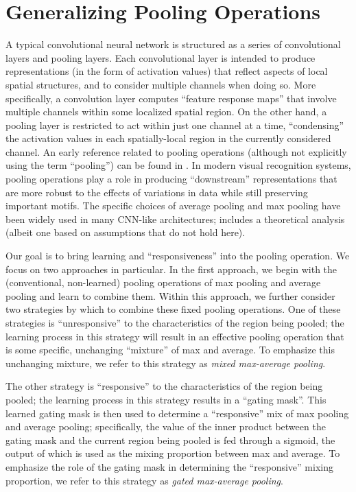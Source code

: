 \documentclass[twoside]{article}
\begin{document}
\vspace{-4mm}
\section{Generalizing Pooling Operations}
\vspace{-4mm}
A typical convolutional neural network is structured as a series of convolutional
layers and pooling layers. Each convolutional layer is intended to produce representations
(in the form of activation values) that reflect aspects of local spatial structures, 
and to consider multiple channels  when doing so. More specifically, a convolution layer computes ``feature response maps''
that involve multiple channels within some localized spatial region. On the other hand, 
a pooling layer is restricted to act within just one channel at a time, ``condensing'' the 
activation values in each spatially-local region in the currently considered channel. An 
early reference related to pooling operations (although not explicitly using the term ``pooling'')
can be found in \cite{hubel1962receptive}. In modern visual recognition systems, pooling operations 
play a role in producing ``downstream'' representations that are more robust to the effects of 
variations in data while still preserving important motifs. The specific choices of average pooling \cite{lecun1989backpropagation,lecun1998gradientbased} 
and max pooling \cite{ranzato2007sparse} have been widely used in many CNN-like
architectures; \cite{boureau2010theoretical} includes a theoretical analysis (albeit one
based on assumptions that do not hold here).

Our goal is to bring learning and ``responsiveness'' into the pooling operation.
We focus on two approaches in particular. In the first approach, we begin with 
the (conventional, non-learned) pooling operations of max pooling and average pooling and learn to combine 
them. Within this approach, we further consider two strategies by which to combine these
fixed pooling operations. One of these strategies is ``unresponsive'' to the characteristics
of the region being pooled; the learning process in this strategy will result in
an effective pooling operation that is some specific, unchanging ``mixture'' of max 
and average. To emphasize this unchanging mixture, we refer to this strategy as 
\emph{mixed max-average pooling}. 

The other strategy is ``responsive'' to the characteristics of the region being pooled; 
the learning process in this strategy results in a ``gating mask''. This learned 
gating mask is then used to determine a ``responsive'' mix of max pooling and average 
pooling; specifically, the value of the inner product between the gating mask and 
the current region being pooled is fed through a sigmoid, the output of which is 
used as the mixing proportion between max and average. To emphasize the role of 
the gating mask in determining the ``responsive'' mixing proportion, we refer to 
this strategy as \emph{gated max-average pooling}. 
\end{document}
